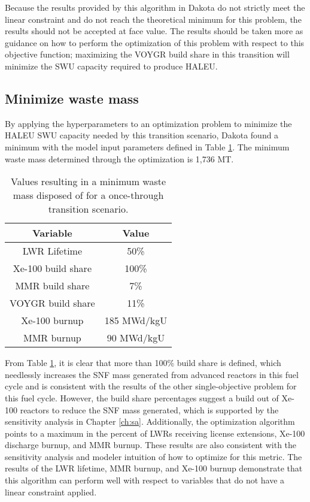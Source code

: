 Because the results provided by this algorithm in Dakota do not strictly 
meet the linear constraint and do not reach the theoretical minimum for 
this problem, the results should not be accepted at face value. The results should 
be taken more as guidance on how to perform the optimization of this problem 
with respect to this objective function; maximizing the VOYGR build share in 
this transition will minimize the \gls{SWU} capacity required to produce \gls{HALEU}.

\subsection{Minimize waste mass}
By applying the hyperparameters to an optimization problem to minimize the 
\gls{HALEU} \gls{SWU} capacity needed by this transition scenario, Dakota
found a minimum with the model input parameters defined in Table 
\ref{tab:soga_ot_waste}. The minimum waste mass determined through the 
optimization is 1,736 MT. 

\begin{table}
    \centering 
    \caption{Values resulting in a minimum waste mass disposed of for 
              a once-through transition scenario.}
    \label{tab:soga_ot_waste}
    \begin{tabular}{c c}
        \hline
        Variable & Value \\
        \hline
        LWR Lifetime & 50\%\\
        Xe-100 build share & 100\%\\
        MMR build share & 7\%\\
        VOYGR build share & 11\%\\
        Xe-100 burnup & 185 MWd/kgU\\
        MMR burnup & 90 MWd/kgU\\
        \hline
    \end{tabular}
\end{table}

From Table \ref{tab:soga_ot_waste}, it is clear that more than 100\% build share
is defined, which needlessly increases the \gls{SNF} mass generated from 
advanced reactors in this fuel cycle and is consistent with the results of 
the other single-objective problem for this fuel cycle. However, the build share 
percentages suggest 
a build out of Xe-100 reactors to reduce the \gls{SNF} mass generated, which 
is supported by the sensitivity analysis in Chapter \ref{ch:sa}. Additionally, 
the optimization algorithm points to a maximum in the percent of \glspl{LWR} 
receiving license extensions, Xe-100 discharge burnup, and \gls{MMR} burnup. 
These results are also consistent with the sensitivity analysis and 
modeler intuition of how to optimize for this metric. The results of the 
\gls{LWR} lifetime, \gls{MMR} burnup, and Xe-100 burnup demonstrate that this 
algorithm can perform well with respect to variables that do not have a 
linear constraint applied. 

